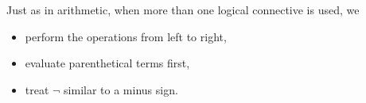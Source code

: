 \guard





Just as in arithmetic, when more than one logical connective is used, we
\begin{itemize}
  \item perform the operations from left to right,
  \item evaluate parenthetical terms first,
  \item treat $\neg$ similar to a minus sign.
\end{itemize}





















